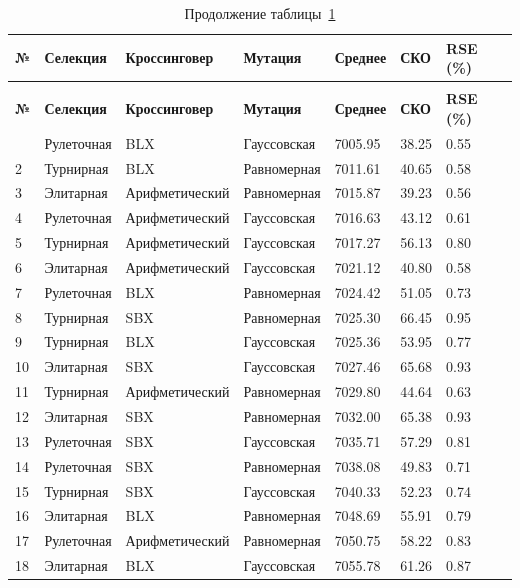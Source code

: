\begin{longtable}{|p{}|p{}|p{}|p{}|p{}|p{}|p{}|}
	\caption{Результаты для задачи ulysses22.tsp. Оптимальное решение 6981.33}\label{tbl:ulysses22.tsp} \\
	\hline
	\textbf{№} & \textbf{Селекция} & \textbf{Кроссинговер} & \textbf{Мутация} & \textbf{Среднее} & \textbf{СКО} & \textbf{RSE (\%)} \\
	\hline
	\endfirsthead
	\caption*{Продолжение таблицы~\ref{tbl:ulysses22.tsp}} \\
	\hline
	\textbf{№} & \textbf{Селекция} & \textbf{Кроссинговер} & \textbf{Мутация} & \textbf{Среднее} & \textbf{СКО} & \textbf{RSE (\%)} \\
	\hline
	\endhead
	\hline
	\endfoot
	\endlastfoot
	1 & Рулеточная & BLX & Гауссовская & 7005.95 & 38.25 & 0.55 \\
	\hline
	2 & Турнирная & BLX & Равномерная & 7011.61 & 40.65 & 0.58 \\
	\hline
	3 & Элитарная & Арифметический & Равномерная & 7015.87 & 39.23 & 0.56 \\
	\hline
	4 & Рулеточная & Арифметический & Гауссовская & 7016.63 & 43.12 & 0.61 \\
	\hline
	5 & Турнирная & Арифметический & Гауссовская & 7017.27 & 56.13 & 0.80 \\
	\hline
	6 & Элитарная & Арифметический & Гауссовская & 7021.12 & 40.80 & 0.58 \\
	\hline
	7 & Рулеточная & BLX & Равномерная & 7024.42 & 51.05 & 0.73 \\
	\hline
	8 & Турнирная & SBX & Равномерная & 7025.30 & 66.45 & 0.95 \\
	\hline
	9 & Турнирная & BLX & Гауссовская & 7025.36 & 53.95 & 0.77 \\
	\hline
	10 & Элитарная & SBX & Гауссовская & 7027.46 & 65.68 & 0.93 \\
	\hline
	11 & Турнирная & Арифметический & Равномерная & 7029.80 & 44.64 & 0.63 \\
	\hline
	12 & Элитарная & SBX & Равномерная & 7032.00 & 65.38 & 0.93 \\
	\hline
	13 & Рулеточная & SBX & Гауссовская & 7035.71 & 57.29 & 0.81 \\
	\hline
	14 & Рулеточная & SBX & Равномерная & 7038.08 & 49.83 & 0.71 \\
	\hline
	15 & Турнирная & SBX & Гауссовская & 7040.33 & 52.23 & 0.74 \\
	\hline
	16 & Элитарная & BLX & Равномерная & 7048.69 & 55.91 & 0.79 \\
	\hline
	17 & Рулеточная & Арифметический & Равномерная & 7050.75 & 58.22 & 0.83 \\
	\hline
	18 & Элитарная & BLX & Гауссовская & 7055.78 & 61.26 & 0.87 \\
	\hline
\end{longtable}



